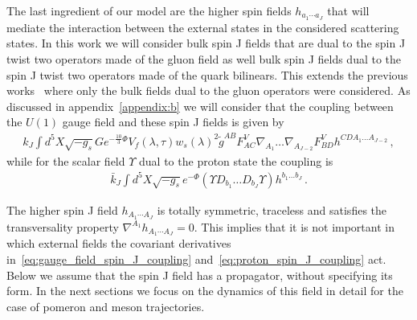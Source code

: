\documentclass[a4paper,12pt]{article}
\begin{document}
The last ingredient of our model are the higher spin fields $h_{a_1 \cdots a_J}$ that will mediate the interaction between the external states in the considered scattering states. In this work we will consider bulk spin J fields that are dual to the spin J twist two operators made of the gluon field as well bulk spin J fields dual to the spin J twist two operators made of the quark bilinears. This extends the previous works~\cite{Ballon-Bayona:2015wra, ballon_bayona_unity_2017, Amorim:2018yod} where only the bulk fields dual to the gluon operators were considered. As discussed in appendix~\ref{appendix:b} we will consider that the coupling between the $U(1)$ gauge field and these spin J fields is given by
\begin{align}
k_J \int d^5X \sqrt{-g_s} G e^{-\frac{10}{3} \Phi} V_f \left( \lambda, \tau \right) {w_s\left(\lambda \right)}^2  \tilde{g}^{AB} F^V_{A C} \nabla_{A_1} \dots \nabla_{A_{J-2}} F^V_{B D} h^{C D A_1 \dots A_{J-2}} \, ,
\label{eq:gauge_field_spin_J_coupling}
\end{align}
while for the scalar field $\Upsilon$ dual to the proton state the coupling is
\begin{align}
\bar{k}_J \int d^5 X \sqrt{-g_s} e^{-\Phi} \left( \Upsilon D_{b_1} \dots D_{b_J} \Upsilon \right) h^{b_1 \dots b_J} \, .
\label{eq:proton_spin_J_coupling}
\end{align}

The higher spin J field $h_{A_1 \cdots A_J}$ is totally symmetric, traceless and satisfies the transversality property $\nabla^{A_1} h_{A_1 \cdots A_J} = 0$. This implies that it is not important in which external fields the covariant derivatives in~\ref{eq:gauge_field_spin_J_coupling} and~\ref{eq:proton_spin_J_coupling} act. 
Below we assume that the spin J field has a propagator, without specifying its form. In the next sections we focus on the dynamics of this field in detail for the case of pomeron and meson trajectories.
\end{document}
